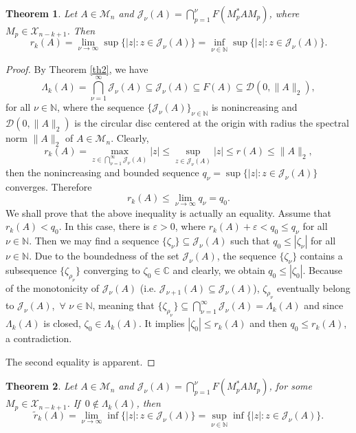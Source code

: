 \documentclass[12pt, reqno]{amsart}
\newtheorem{theorem}{Theorem}[section]
\theoremstyle{definition}
\theoremstyle{remark}
\numberwithin{equation}{section}
\begin{document}
\begin{theorem}\label{th3}
Let $A\in\mathcal{M}_{n}$ and $\mathcal{J}_{\nu}(A)=\bigcap_{p=1}^{\nu}F(M_{p}^{*}AM_{p})$, where $M_{p}\in\mathcal{X}_{n-k+1}$. Then
\begin{equation*}
r_{k}(A)=\lim_{\nu\to\infty}\sup\{|z| : z\in\mathcal{J}_{\nu}(A)\}
=\inf_{\nu\in\mathbb{N}}\sup\{|z| : z\in\mathcal{J}_{\nu}(A)\}.
\end{equation*}
\end{theorem}
\begin{proof}
By Theorem \ref{th2}, we have
\begin{equation}\label{rel7}
\Lambda_{k}(A)=\bigcap_{\nu=1}^{\infty}\mathcal{J}_{\nu}(A)\subseteq\mathcal{J}_{\nu}(A)\subseteq F(A)
\subseteq\mathcal{D}(0,\|A\|_{2}),
\end{equation}
for all $\nu\in\mathbb{N}$, where the sequence $\{\mathcal{J}_{\nu}(A)\}_{\nu\in\mathbb{N}}$ is nonincreasing and $\mathcal{D}(0,\|A\|_{2})$ is the circular disc centered at the origin with radius the spectral norm $\|A\|_{2}$ of $A\in\mathcal{M}_{n}$. Clearly,
\[
r_{k}(A)=\max_{z\in\bigcap_{\nu=1}^{\infty}\mathcal{J}_{\nu}(A)}|z|\leq
\sup_{z\in\mathcal{J}_{\nu}(A)}|z|\leq r(A)\leq\|A\|_{2},
\]
then the nonincreasing and bounded sequence $q_{\nu}=\sup\{|z|: z\in\mathcal{J}_{\nu}(A)\}$  converges. Therefore
\[
r_{k}(A)\leq\lim_{\nu\to\infty}q_{\nu}=q_{0}.
\]
We shall prove that the above inequality is actually an equality. Assume  that $r_{k}(A)<q_{0}$. In this case, there is $\varepsilon>0$, where $r_{k}(A)+\varepsilon<q_{0}\leq q_{\nu}$ for all $\nu\in\mathbb{N}$. Then we may find a sequence  $\{\zeta_{\nu}\}\subseteq\mathcal{J}_{\nu}(A)$ such that $q_{0}\leq |\zeta_{\nu}|$ for all $\nu\in\mathbb{N}$. Due to the boundedness of the set $\mathcal{J}_{\nu}(A)$, the sequence $\{\zeta_{\nu}\}$ contains a subsequence $\{\zeta_{\rho_{\nu}}\}$ converging to $\zeta_{0}\in\mathbb{C}$ and clearly, we obtain  $q_{0}\leq |\zeta_{0}|$. Because of the monotonicity of $\mathcal{J}_{\nu}(A)$ (i.e. $\mathcal{J}_{\nu+1}(A)\subseteq\mathcal{J}_{\nu}(A)$), $\zeta_{\rho_{\nu}}$ eventually belong to $\mathcal{J}_{\nu}(A)$,\, $\forall\,\,\nu\in\mathbb{N}$, meaning that    $\{\zeta_{\rho_{\nu}}\}\subseteq\bigcap_{\nu=1}^{\infty}\mathcal{J}_{\nu}(A)=\Lambda_{k}(A)$ and since $\Lambda_{k}(A)$ is closed, $\zeta_{0}\in\Lambda_{k}(A)$. It implies $|\zeta_{0}|\leq r_{k}(A)$ and then $q_{0}\leq r_{k}(A)$, a contradiction.

The second equality is apparent.
\end{proof}
\begin{theorem}\label{th4}
Let $A\in\mathcal{M}_{n}$ and $\mathcal{J}_{\nu}(A)=\bigcap_{p=1}^{\nu}F(M_{p}^{*}AM_{p})$, for some $M_{p}\in\mathcal{X}_{n-k+1}$. If\, $0\notin\Lambda_{k}(A)$, then
\begin{equation*}
\widetilde{r}_{k}(A)=\lim_{\nu\to\infty}\inf\{|z|: z\in\mathcal{J}_{\nu}(A)\}=\sup_{\nu\in\mathbb{N}}\inf\{|z|: z\in\mathcal{J}_{\nu}(A)\}.
\end{equation*}
\end{theorem}
\end{document}
